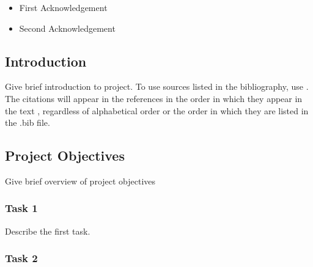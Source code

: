 \documentclass{article}
\begin{document}

\begin{itemize} %
    \item First Acknowledgement %
    \item Second Acknowledgement %
\end{itemize}

\newpage %




\newpage %
\begin{doublespacing} %
\setcounter{page}{1} %

\section{Introduction} %

\noindent Give brief introduction to project. To use sources listed in the bibliography, use \cite{knuth:1984}. The citations \cite{latex:companion} will appear in the references \cite{latex2e} in the order in which they appear in the text \cite{texbook_label}, regardless of alphabetical order or the order in which they are listed in the .bib file.

\subsection{Project Objectives} %

\noindent Give brief overview of project objectives

\subsubsection{Task 1} %

\noindent Describe the first task. 

\subsubsection{Task 2} %


\end{doublespacing}
\end{document}

